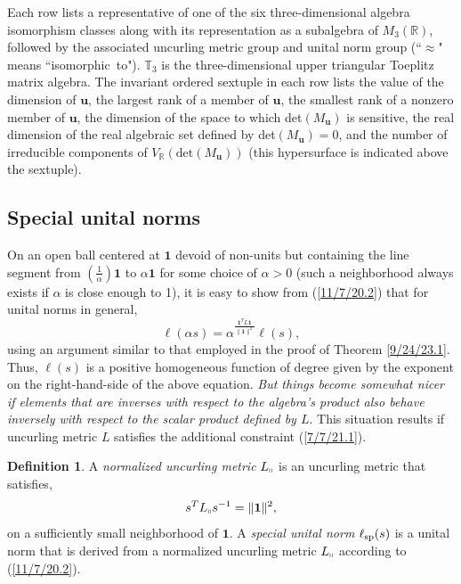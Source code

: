\documentclass{amsart}
\numberwithin{equation}{section}
\theoremstyle{definition}
\newtheorem{definition}[theorem]{Definition}
\numberwithin{theorem}{section}
\begin{document}
\vspace{1cm}


 {\small Each row lists a representative  of one of the six three-dimensional algebra isomorphism classes along with its representation as a subalgebra of $M_3(\mathbb{R})$, followed by the associated uncurling metric group and unital norm group (``$\approx$" means \mbox{``isomorphic to"}).  $\mathbb{T}_3$ is the three-dimensional upper triangular Toeplitz matrix algebra. The invariant ordered sextuple in each row lists the value of the dimension of $\mathbf{u}$, the largest rank of a member of $\mathbf{u}$, the smallest rank of a nonzero member of $\mathbf{u}$, the dimension of the space to which det$(M_{\mathbf{u}})$ is sensitive, the real dimension of the real algebraic set defined by det$(M_{\mathbf{u}}) =0$, and the number of irreducible components of $V_\mathbb{R}(\text{det}(M_{\mathbf{u}}))$ (this hypersurface is indicated above the sextuple).}
 
\newpage

\subsection{Special unital norms} \enlargethispage{1cm}
On an open ball centered at $\mathbf{1}$ devoid of non-units but containing the line segment from $\left(\frac{1}{\alpha}\right)\mathbf{1}$ to $\alpha\mathbf{1}$ for some choice of $\alpha>0$ (such a neighborhood always exists if $\alpha$ is close enough to 1), it is easy to show from (\ref{11/7/20.2}) that for unital norms in general,  \[  \ell(\alpha s) = \alpha^{\frac{\mathbf{1}^T L \mathbf{1}}{\|\mathbf{1}\|^2}} \ell(s),\] using an argument similar to that employed in the proof of Theorem \ref{9/24/23.1}. Thus, $ \ell(s)$ is a positive homogeneous function of degree given by the exponent on the right-hand-side of the above equation.  
   {\it But things become somewhat nicer if elements that are inverses with respect to the algebra's product also behave inversely with respect to the scalar product defined by $L$}.  
    This situation results if uncurling metric $L$ satisfies the additional constraint (\ref{7/7/21.1}).

    \begin{definition}\label{9/20/23.1} A {\it normalized uncurling metric} $L_{\shortparallel}$ is an uncurling metric that satisfies, \begin{equation} \label{7/7/21.1} s^TL_{\shortparallel} s^{-1} =\|{\bf 1}\|^2,\end{equation} on a sufficiently small neighborhood of $\mathbf{1}$.   A {\it special unital norm} $\ell_{\rm sp}(s)$ is a unital norm that is derived from a normalized uncurling metric $L_{\shortparallel}$ according to (\ref{11/7/20.2}). 
\end{definition}
\end{document}
